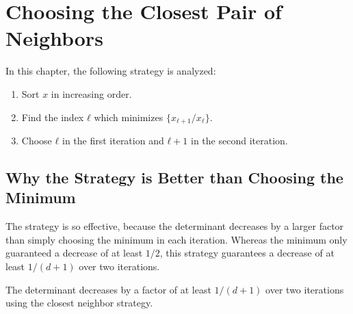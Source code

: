 \chapter{Choosing the Closest Pair of Neighbors}

In this chapter, the following strategy is analyzed:

\begin{enumerate}
  \item Sort $x$ in increasing order.
  \item Find the index $ℓ$ which minimizes $\{x_{ℓ+1}/x_ℓ\}$.
  \item Choose $ℓ$ in the first iteration and $ℓ + 1$ in the second iteration.
\end{enumerate}


\section{Why the Strategy is Better than Choosing the Minimum}

The strategy is so effective, because the determinant decreases by a larger
factor than simply choosing the minimum in each iteration.
Whereas the minimum only guaranteed a decrease of at least $1/2$,
this strategy guarantees a decrease of at least $1/(d+1)$ over two iterations.

\begin{theorem}
  The determinant decreases by a factor of at least $1/(d+1)$ over two iterations
  using the closest neighbor strategy.
\end{theorem}

